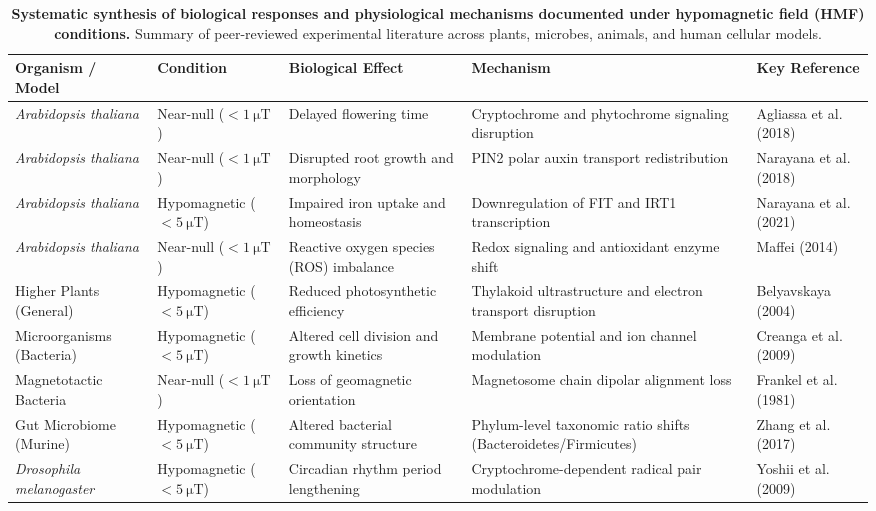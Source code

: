 \begin{table}[t]
\centering
\footnotesize
\caption{\textbf{Systematic synthesis of biological responses and physiological mechanisms documented under hypomagnetic field (HMF) conditions.} Summary of peer-reviewed experimental literature across plants, microbes, animals, and human cellular models.}
\label{tab:biology_review}
\begin{tabular}{p{2.8cm}p{2.2cm}p{3.4cm}p{4.4cm}p{3.0cm}}
\toprule
\textbf{Organism / Model} & \textbf{Condition} & \textbf{Biological Effect} & \textbf{Mechanism} & \textbf{Key Reference} \\
\midrule
\textit{Arabidopsis thaliana} & Near-null ($<\SI{1}{\micro\tesla}$) & Delayed flowering time & Cryptochrome and phytochrome signaling disruption & Agliassa et al. (2018) \citep{Agliassa2018} \\
\textit{Arabidopsis thaliana} & Near-null ($<\SI{1}{\micro\tesla}$) & Disrupted root growth and morphology & PIN2 polar auxin transport redistribution & Narayana et al. (2018) \citep{Narayana2018} \\
\textit{Arabidopsis thaliana} & Hypomagnetic ($<\SI{5}{\micro\tesla}$) & Impaired iron uptake and homeostasis & Downregulation of FIT and IRT1 transcription & Narayana et al. (2021) \citep{Narayana2021} \\
\textit{Arabidopsis thaliana} & Near-null ($<\SI{1}{\micro\tesla}$) & Reactive oxygen species (ROS) imbalance & Redox signaling and antioxidant enzyme shift & Maffei (2014) \citep{Maffei2014} \\
Higher Plants (General) & Hypomagnetic ($<\SI{5}{\micro\tesla}$) & Reduced photosynthetic efficiency & Thylakoid ultrastructure and electron transport disruption & Belyavskaya (2004) \citep{Belyavskaya2004} \\
Microorganisms (Bacteria) & Hypomagnetic ($<\SI{5}{\micro\tesla}$) & Altered cell division and growth kinetics & Membrane potential and ion channel modulation & Creanga et al. (2009) \citep{Creanga2009} \\
Magnetotactic Bacteria & Near-null ($<\SI{1}{\micro\tesla}$) & Loss of geomagnetic orientation & Magnetosome chain dipolar alignment loss & Frankel et al. (1981) \citep{Frankel1981} \\
Gut Microbiome (Murine) & Hypomagnetic ($<\SI{5}{\micro\tesla}$) & Altered bacterial community structure & Phylum-level taxonomic ratio shifts (Bacteroidetes/Firmicutes) & Zhang et al. (2017) \citep{Zhang2017} \\
\textit{Drosophila melanogaster} & Hypomagnetic ($<\SI{5}{\micro\tesla}$) & Circadian rhythm period lengthening & Cryptochrome-dependent radical pair modulation & Yoshii et al. (2009) \citep{Yoshii2009} \\

\end{tabular}
\end{table}
